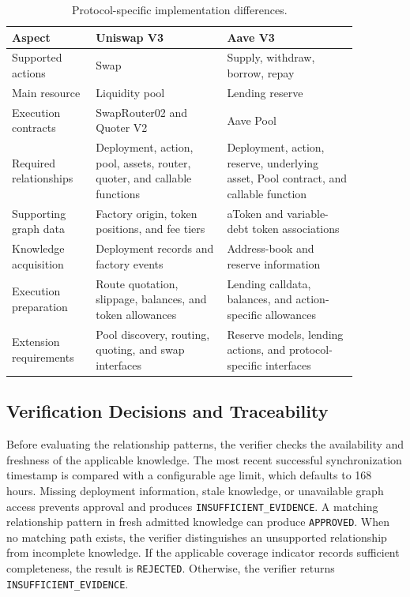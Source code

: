 \begin{table}[htbp]
\centering
\begingroup
\small
\renewcommand{\arraystretch}{1.18}
\caption{Protocol-specific implementation differences.}
\label{tab:protocol_implementation_differences}

\begin{tabular}{
    @{}
    p{0.21\linewidth}
    p{0.33\linewidth}
    p{0.33\linewidth}
    @{}
}
\hline
\textbf{Aspect} &
\textbf{Uniswap V3} &
\textbf{Aave V3} \\
\hline

Supported actions &
Swap &
Supply, withdraw, borrow, repay \\

Main resource &
Liquidity pool &
Lending reserve \\

Execution contracts &
SwapRouter02 and Quoter V2 &
Aave Pool \\

Required relationships &
Deployment, action, pool, assets, router, quoter,
and callable functions &
Deployment, action, reserve, underlying asset,
Pool contract, and callable function \\

Supporting graph data &
Factory origin, token positions, and fee tiers &
aToken and variable-debt token associations \\

Knowledge acquisition &
Deployment records and factory events &
Address-book and reserve information \\

Execution preparation &
Route quotation, slippage, balances,
and token allowances &
Lending calldata, balances, and
action-specific allowances \\

Extension requirements &
Pool discovery, routing, quoting,
and swap interfaces &
Reserve models, lending actions,
and protocol-specific interfaces \\

\hline
\end{tabular}
\endgroup
\end{table}


\subsection{Verification Decisions and Traceability}

Before evaluating the relationship patterns, the verifier
checks the availability and freshness of the applicable
knowledge. The most recent successful synchronization
timestamp is compared with a configurable age limit,
which defaults to 168 hours. Missing deployment information,
stale knowledge, or unavailable graph access prevents
approval and produces \texttt{INSUFFICIENT\_EVIDENCE}. A matching relationship pattern in fresh admitted knowledge
can produce \texttt{APPROVED}. When no matching path exists,
the verifier distinguishes an unsupported relationship
from incomplete knowledge. If the applicable coverage
indicator records sufficient completeness, the result is
\texttt{REJECTED}. Otherwise, the verifier returns
\texttt{INSUFFICIENT\_EVIDENCE}.


